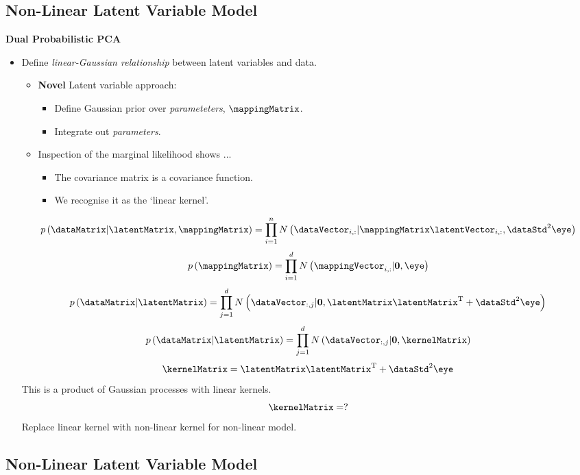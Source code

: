 \subsection{Non-Linear Latent Variable Model}

\textbf{Dual Probabilistic PCA}
\begin{itemize}
\item Define \emph{linear-Gaussian relationship} between latent variables
and data.

\begin{itemize}
\item \textbf{Novel} Latent variable approach:

\begin{itemize}
\item Define Gaussian prior over \emph{parameteters}, $\mappingMatrix$.
\item Integrate out \emph{parameters}.
\end{itemize}
\item Inspection of the marginal likelihood shows ...

\begin{itemize}
\item The covariance matrix is a covariance function.
\item We recognise it as the `linear kernel'.
\end{itemize}
\end{itemize}
\begin{center}
\[
p\left(\dataMatrix|\latentMatrix,\mappingMatrix\right)=\prod_{i=1}^{n}N\left(\dataVector_{i,:}|\mappingMatrix\latentVector_{i,:},\dataStd^{2}\eye\right)\]
\[
p\left(\mappingMatrix\right)=\prod_{i=1}^{d}N\left(\mappingVector_{i,:}|\mathbf{0},\eye\right)\]
\[
p\left(\dataMatrix|\latentMatrix\right)=\prod_{j=1}^{d}N\left(\dataVector_{:,j}|\mathbf{0},\latentMatrix\latentMatrix^{\mathrm{T}}+\dataStd^{2}\eye\right)\]
\[
p\left(\dataMatrix|\latentMatrix\right)=\prod_{j=1}^{d}N\left(\dataVector_{:,j}|\mathbf{0},\kernelMatrix\right)\]
\[
\kernelMatrix=\latentMatrix\latentMatrix^{\mathrm{T}}+\dataStd^{2}\eye\]
This is a product of Gaussian processes with linear kernels.\[
\kernelMatrix=?\]
Replace linear kernel with non-linear kernel for non-linear model.
\par\end{center}

\end{itemize}
\subsection{Non-Linear Latent Variable Model}

